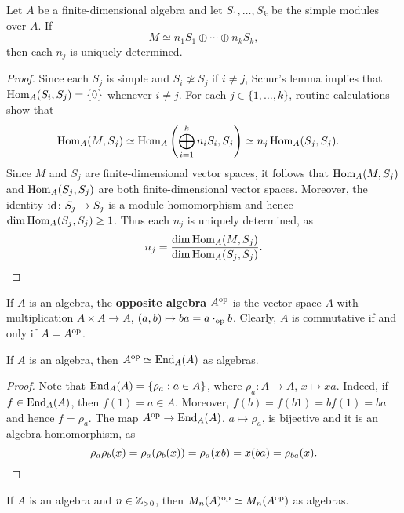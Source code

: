 \begin{theorem}
Let $A$ be a finite-dimensional algebra and let 
$S_1,\dots,S_k$ be the simple modules over $A$. 
If 
\[
M\simeq n_1S_1\oplus\cdots\oplus n_kS_k,
\]
then each $n_j$ is uniquely determined.  
\end{theorem}

\begin{proof}
	Since each $S_j$ is simple and $S_i\not\simeq S_j$ if $i\ne j$, 
    Schur's lemma implies that 
	$\operatorname{Hom}_A(S_i,S_j)=\{0\}$ whenever $i\ne j$. 
	For each $j\in\{1,\dots,k\}$, routine calculations show that 
	\begin{align*}
		\operatorname{Hom}_A(M,S_j) &\simeq \operatorname{Hom}_A\left(\bigoplus_{i=1}^k n_i S_i,S_j\right)
		\simeq n_j\operatorname{Hom}_A(S_j,S_j). 
	\end{align*} 
	Since $M$ and $S_j$ are finite-dimensional vector spaces, it follows that
	$\operatorname{Hom}_A(M,S_j)$ and $\operatorname{Hom}_A(S_j,S_j)$ 
	are both finite-dimensional vector spaces.  
	Moreover, the identity $\operatorname{id}\colon S_j\to S_j$ 
	is a module homomorphism and hence  
	$\dim\operatorname{Hom}_A(S_j,S_j)\geq 1$. 
	Thus each $n_j$ is uniquely determined, as  
	\[ 
	n_j=\frac{\dim\operatorname{Hom}_A(M,S_j)}{\dim\operatorname{Hom}_A(S_j,S_j)}.\qedhere
	\]
\end{proof}

If $A$ is an algebra, the \textbf{opposite algebra} $A^{\operatorname{op}}$ is the vector space 
$A$ with multiplication $A\times A\to A$, $(a,b)\mapsto ba=a\cdot_{\operatorname{op}}b$. Clearly,
$A$ is commutative if and only if $A=A^{\operatorname{op}}$. 

\begin{lemma}
	\label{lem:A^op}
    If $A$ is an algebra, then $A^{\operatorname{op}}\simeq\operatorname{End}_A(A)$ as algebras.  
\end{lemma}

\begin{proof}
	Note that $\operatorname{End}_A(A)=\{\rho_a:a\in A\}$, where $\rho_a\colon
	A\to A$, $x\mapsto xa$. Indeed, if $f\in\operatorname{End}_A(A)$, then 
	$f(1)=a\in A$. Moreover, $f(b)=f(b1)=bf(1)=ba$ and hence 
	$f=\rho_a$. The map $A^{\operatorname{op}}\to \operatorname{End}_A(A)$, $a\mapsto\rho_a$, 
	is bijective and it is an algebra homomorphism, as 
    \[
		\rho_a\rho_b(x)=\rho_a(\rho_b(x))=\rho_a(xb)=x(ba)=\rho_{ba}(x).\qedhere
    \]
\end{proof}

\begin{lemma}
	\label{lem:Mn_op}
	If $A$ is an algebra and $n\in\mathbb{Z}_{>0}$, then $M_n(A)^{\operatorname{op}}\simeq
	M_n(A^{\operatorname{op}})$ as algebras.   
\end{lemma}

